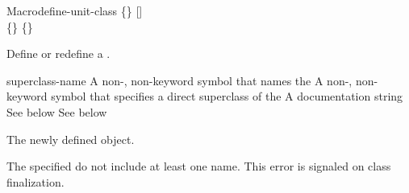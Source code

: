 \documentclass[10pt,twoside,english,pdftex]{article}
\begin{document}

\begin{functiondoc}{Macro}{define-unit-class}{ 
   \code{(}\{\}\superstar\code{)}
   [] \\
   \code{(}\{\}\superstar\code{)}
   \{\}\superstar{} \returns{}
   }
%
%
%

\fnsyntax

\fnpurpose Define or redefine a .

\fnpackage {}

\fnmodule {}

\fnargs
\begin{args}{superclass-name}
 A non-\nil, non-keyword symbol that names the
 A non-\nil, non-keyword symbol that specifies a
direct superclass of the    
\arg[documentation] A documentation string
 See below
 See below
\end{args}

\fnreturns The newly defined  object.

\fnerrors The specified  do not include at least
one  name.  This error is signaled on class finalization.


\end{functiondoc}
\end{document}
